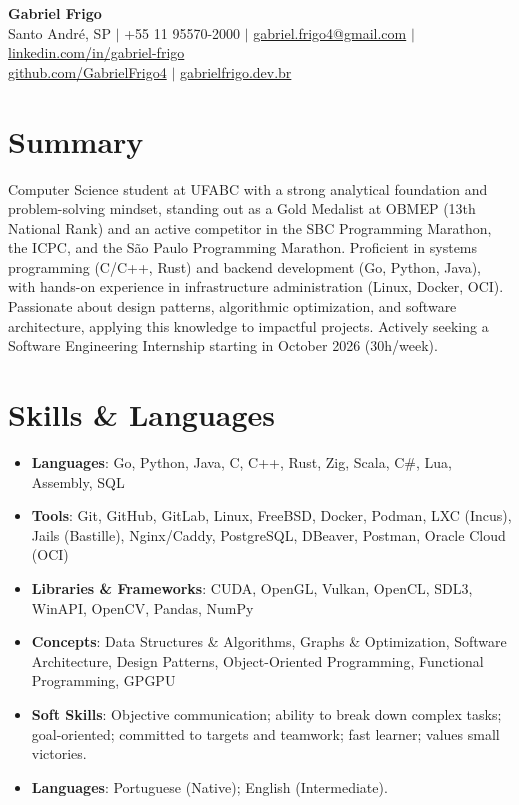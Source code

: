 \documentclass[letterpaper,10pt]{article}
\newcommand{\resumeItem}[1]{\item\small{#1}}
\newcommand{\resumeSubHeadingList}{\begin{itemize}[leftmargin=0.15in, label={}]}
\newcommand{\resumeSubHeadingListEnd}{\end{itemize}}
\begin{document}
\begin{center}
  \textbf{\Huge Gabriel Frigo} \\
  \small Santo André, SP $|$ +55 11 95570-2000 $|$ \href{mailto:gabriel.frigo4@gmail.com}{gabriel.frigo4@gmail.com} $|$
  \href{https://linkedin.com/in/gabriel-frigo-b6727b275/}{linkedin.com/in/gabriel-frigo} \\
  \href{https://github.com/GabrielFrigo4}{github.com/GabrielFrigo4} $|$
  \href{https://gabrielfrigo.dev.br}{gabrielfrigo.dev.br}
\end{center}

\section{Summary}
Computer Science student at UFABC with a strong analytical foundation and problem-solving mindset, standing out as a Gold Medalist at OBMEP (13th National Rank) and an active competitor in the SBC Programming Marathon, the ICPC, and the São Paulo Programming Marathon. Proficient in systems programming (C/C++, Rust) and backend development (Go, Python, Java), with hands-on experience in infrastructure administration (Linux, Docker, OCI). Passionate about design patterns, algorithmic optimization, and software architecture, applying this knowledge to impactful projects. Actively seeking a Software Engineering Internship starting in October 2026 (30h/week).

\section{Skills \& Languages}
\resumeSubHeadingList
  \resumeItem{\textbf{Languages}: Go, Python, Java, C, C++, Rust, Zig, Scala, C\#, Lua, Assembly, SQL}
  \resumeItem{\textbf{Tools}: Git, GitHub, GitLab, Linux, FreeBSD, Docker, Podman, LXC (Incus), Jails (Bastille), Nginx/Caddy, PostgreSQL, DBeaver, Postman, Oracle Cloud (OCI)}
  \resumeItem{\textbf{Libraries \& Frameworks}: CUDA, OpenGL, Vulkan, OpenCL, SDL3, WinAPI, OpenCV, Pandas, NumPy}
  \resumeItem{\textbf{Concepts}: Data Structures \& Algorithms, Graphs \& Optimization, Software Architecture, Design Patterns, Object-Oriented Programming, Functional Programming, GPGPU}
  \resumeItem{\textbf{Soft Skills}: Objective communication; ability to break down complex tasks; goal-oriented; committed to targets and teamwork; fast learner; values small victories.}
  \resumeItem{\textbf{Languages}: Portuguese (Native); English (Intermediate).}
\resumeSubHeadingListEnd
\end{document}
